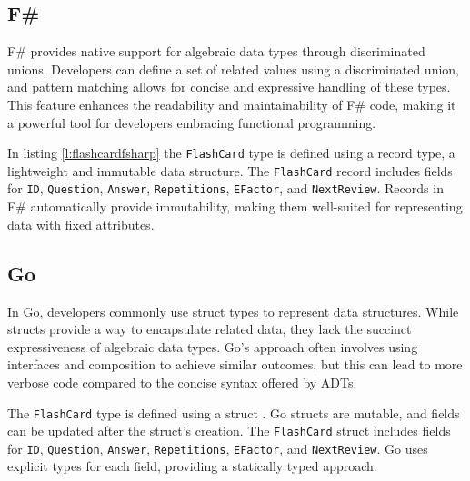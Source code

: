         \subsection*{F\#}
        F\# provides native support for algebraic data types through discriminated unions. Developers can define a set of related values using a discriminated union, and pattern matching allows for concise and expressive handling of these types. This feature enhances the readability and maintainability of F\# code, making it a powerful tool for developers embracing functional programming.


        In listing \ref{l:flashcardfsharp} the \texttt{FlashCard} type is defined using a record type, a lightweight and immutable data structure. The \texttt{FlashCard} record includes fields for \texttt{ID}, \texttt{Question}, \texttt{Answer}, \texttt{Repetitions}, \texttt{EFactor}, and \texttt{NextReview}. Records in F\# automatically provide immutability, making them well-suited for representing data with fixed attributes.


        \subsection*{Go}
        In Go, developers commonly use struct types to represent data structures. While structs provide a way to encapsulate related data, they lack the succinct expressiveness of algebraic data types. Go's approach often involves using interfaces and composition to achieve similar outcomes, but this can lead to more verbose code compared to the concise syntax offered by ADTs.

        The \texttt{FlashCard} type is defined using a struct . Go structs are mutable, and fields can be updated after the struct's creation. The \texttt{FlashCard} struct includes fields for \texttt{ID}, \texttt{Question}, \texttt{Answer}, \texttt{Repetitions}, \texttt{EFactor}, and \texttt{NextReview}. Go uses explicit types for each field, providing a statically typed approach.

